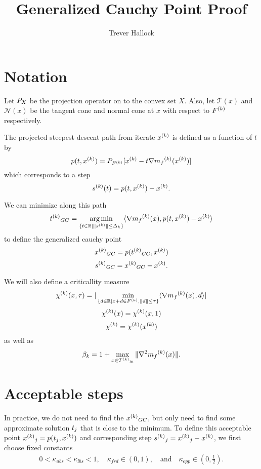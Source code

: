 \documentclass{article}
\title{Generalized Cauchy Point Proof}
\author{Trever Hallock}
\begin{document}
\section{Notation}

Let $P_X$ be the projection operator on to the convex set $X$.
Also, let $\mathcal T(x)$ and $\mathcal N(x)$ be the tangent cone and normal cone at $x$ with respect to ${F}^{(k)}$ respectively.

The projected steepest descent path from iterate ${x}^{(k)}$ is defined as a function of $t$ by
\[ p(t,{x}^{(k)}) = P_{{F}^{(k)}}[{x}^{(k)}-t\nabla{{m}_f}^{(k)}({x}^{(k)})] \]
which corresponds to a step
\[ {s}^{(k)}(t) = p(t,{x}^{(k)})-{x}^{(k)}. \]

We can minimize along this path 
\[{{t}^{(k)}}_{GC} = \operatorname*{arg\,min}_{\{t\in\mathbb R|\|{s}^{(k)} \| \le \Delta_k\}} \langle \nabla{{m}_f}^{(k)}(x), p(t,{x}^{(k)}) - {x}^{(k)} \rangle \]
to define the generalized cauchy point
\[{{x}^{(k)}}_{GC} = p({{t}^{(k)}}_{GC}, {x}^{(k)})\]
\[{{s}^{(k)}}_{GC} = {{x}^{(k)}}_{GC}-{x}^{(k)}.\]

We will also define a criticallity measure
\begin{align}
\label{chi_definition} {\chi^{(k)}}(x, \tau) = | \min_{\{d \in \mathbb R | x+d \in {F}^{(k)}, \|d\| \le \tau\}}\langle \nabla{{m}_f}^{(k)}(x), d\rangle|
\end{align}
\[{\chi^{(k)}}(x) = {\chi^{(k)}}(x, 1)\]
\[{\chi^{(k)}} = {\chi^{(k)}}({x}^{(k)})\]
as well as
\[\beta_k = 1 + \max_{x\in{T^{(k)}}_{\text{in}}}\|\nabla^2{{m}_f}^{(k)}(x)\|.\]

\section{Acceptable steps}
\label{close_enough}
In practice, we do not need to find the ${{x}^{(k)}}_{GC}$, but only need to find some approximate solution $t_j$ that is close to the minimum.
To define this acceptable point ${{x}^{(k)}}_{j} = p(t_j, {x}^{(k)})$ and corresponding step ${{s}^{(k)}}_{j} = {{x}^{(k)}}_{j} - {x}^{(k)}$, we first choose fixed constants
\begin{align}
0 < \kappa_{ubs} < \kappa_{lbs} < 1, \quad \kappa_{frd} \in (0, 1), \quad \text{and} \quad\kappa_{epp} \in (0, \frac 1 2 ).
\end{align}
\end{document}
